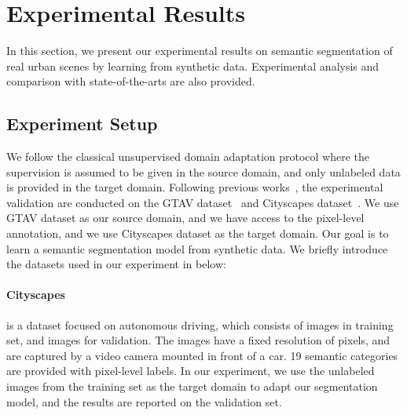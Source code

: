 \documentclass[10pt,twocolumn,letterpaper]{article}
\begin{document}
\begin{table*}[h]
{\begin{tabular}{ c| c |c c| c c c c c c c c c c c c c c c c c c  c | c}
\hline
\end{tabular}
}
\vspace{2mm}
\caption{The segmentation results on the Cityscapes dataset by using the GTAV dataset as the source domain. DeepLab and PSPNet are used as the base model, respectively. We report different variants of our proposed ROAD-Net, where ``dst'' and ``spt'' in the head row refers to the \textit{target guided distillation} module and the \textit{spatial-aware adaptation} module, respectively. The ``NonAdapt'' refers to the vanilla model which is trained using the GTAV data only. The best results for each base model are denoted in bold. }
\vspace{-3mm}
\label{tab:main_results}
\end{table*}

\section{Experimental Results}
\label{sec:exp}
In this section, we present our experimental results on semantic segmentation of real urban scenes by learning from synthetic data. Experimental analysis and comparison with state-of-the-arts are also provided. 

\subsection{Experiment Setup}
We follow the classical unsupervised domain adaptation protocol where the supervision is assumed to be given in the source domain, and only unlabeled data is provided in the target domain. Following previous works~\cite{hoffman2016fcns,zhang2017curriculum}, the experimental validation are conducted on the GTAV dataset~\cite{richter2016playing} and Cityscapes dataset~\cite{Cordts2016Cityscapes}. We use GTAV dataset as our source domain, and we have access to the pixel-level annotation, and we use Cityscapes dataset as the target domain. Our goal is to learn a semantic segmentation model from synthetic data. We briefly introduce the datasets used in our experiment in below:

\vspace{-4mm}
\paragraph{Cityscapes} is a dataset focused on autonomous driving, which consists of  images in training set, and  images for validation. The images have a fixed resolution of  pixels, and are captured by a video camera mounted in front of a car. 19 semantic categories are provided with pixel-level labels. In our experiment, we use the unlabeled images from the training set as the target domain to adapt our segmentation model, and the results are reported on the validation set. 
\end{document}
